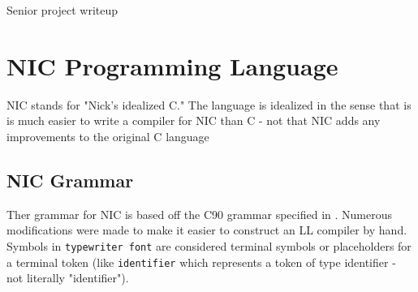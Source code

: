 \documentclass{article}
\begin{document}
Senior project writeup

\section{NIC Programming Language}
NIC stands for "Nick's idealized C."  
The language is idealized in the sense that is is much easier to write a compiler for NIC than C - not that NIC adds any improvements to the original C language

\subsection{NIC Grammar}
Ther grammar for NIC is based off the C90 grammar specified in \cite{cpl}.
Numerous modifications were made to make it easier to construct an LL compiler by hand.
Symbols in \texttt{typewriter font} are considered terminal symbols or placeholders for a terminal token (like \texttt{identifier} which represents a token of type identifier - not literally "identifier").
\end{document}
